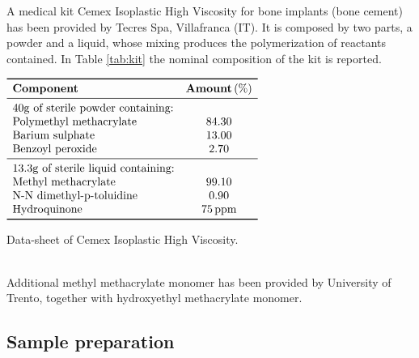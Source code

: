 \documentclass[a4paper, 11pt]{article}
\begin{document}
A medical kit Cemex Isoplastic High Viscosity for bone implants (bone cement) has been provided by Tecres Spa, Villafranca (IT). It is composed by two parts, a powder and a liquid, whose mixing produces the polymerization of reactants contained. In Table \ref{tab:kit} the nominal composition of the kit is reported. 
\begin{table}[htp]
\centering
$
\begin{array}{lc}
\toprule
\textbf{Component} & \textbf{Amount}\,(\%) \\
\midrule
\text{$40\si{g}$ of sterile powder containing:} & \\ 
\text{Polymethyl methacrylate} & 84.30  \\
\text{Barium sulphate} & 13.00  \\
\text{Benzoyl peroxide} & 2.70  \\
\midrule 
\text{$13.3\si{g}$ of sterile liquid containing:} & \\ 
\text{Methyl methacrylate} & 99.10  \\
\text{N-N dimethyl-p-toluidine} & 0.90  \\
\text{Hydroquinone} & 75\,\text{ppm}  \\
\bottomrule
\end{array}
$
\caption{Data-sheet of Cemex Isoplastic High Viscosity.}
\label{tab:kit}
\end{table}\\
Additional methyl methacrylate monomer has been provided by University of Trento, together with hydroxyethyl methacrylate monomer. 

\subsection{Sample preparation}
\end{document}
